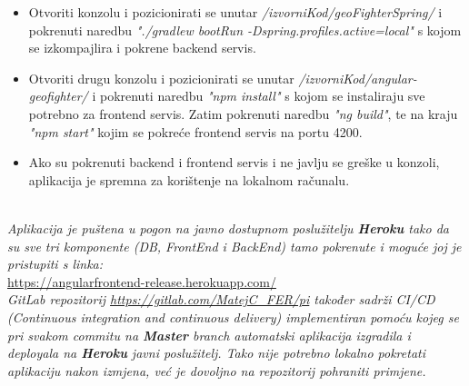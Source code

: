 \begin{itemize}
				
				\item Otvoriti konzolu i pozicionirati se unutar \textit{/izvorniKod/geoFighterSpring/} i pokrenuti naredbu \textit{"./gradlew bootRun -Dspring.profiles.active=local"} s kojom se izkompajlira i pokrene backend servis.
				
				\item Otvoriti drugu konzolu i pozicionirati se unutar \textit{/izvorniKod/angular-geofighter/} i pokrenuti naredbu \textit{"npm install"} s kojom se instaliraju sve potrebno za frontend servis. Zatim pokrenuti naredbu \textit{"ng build"}, te na kraju \textit{"npm start"} kojim se pokreće frontend servis na portu 4200.
				
				\item Ako su pokrenuti backend i frontend servis i ne javlju se greške u konzoli, aplikacija je spremna za korištenje na lokalnom računalu.\\\\
				
			\end{itemize}
		
			
			\textit{Aplikacija je puštena u pogon na javno dostupnom poslužitelju \textbf{Heroku} tako da su sve tri komponente (DB, FrontEnd i BackEnd) tamo pokrenute i moguće joj je pristupiti s linka:}\\
			\url{https://angularfrontend-release.herokuapp.com/}\\
						
			\textit{GitLab repozitorij \url{https://gitlab.com/MatejC_FER/pi} također sadrži CI/CD (Continuous integration and continuous delivery) implementiran pomoću kojeg se pri svakom commitu na \textbf{Master} branch automatski aplikacija izgradila i deployala na \textbf{Heroku} javni poslužitelj. Tako nije potrebno lokalno pokretati aplikaciju nakon izmjena, već je dovoljno na repozitorij pohraniti primjene.}
			
			
			\eject 